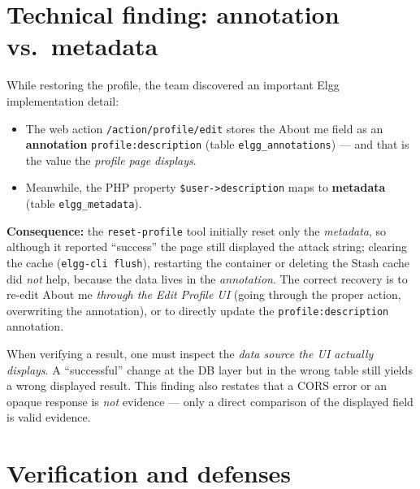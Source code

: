 \documentclass[11pt,a4paper]{article}
\begin{document}
\section{Technical finding: annotation vs.\ metadata}
While restoring the profile, the team discovered an important Elgg implementation detail:
\begin{itemize}
  \item The web action \texttt{/action/profile/edit} stores the About me field as an \textbf{annotation} \texttt{profile:description} (table \texttt{elgg\_annotations}) — and that is the value the \emph{profile page displays}.
  \item Meanwhile, the PHP property \texttt{\$user->description} maps to \textbf{metadata} (table \texttt{elgg\_metadata}).
\end{itemize}
\textbf{Consequence:} the \texttt{reset-profile} tool initially reset only the \emph{metadata}, so although it reported ``success'' the page still displayed the attack string; clearing the cache (\texttt{elgg-cli flush}), restarting the container or deleting the Stash cache did \emph{not} help, because the data lives in the \emph{annotation}. The correct recovery is to re-edit About me \emph{through the Edit Profile UI} (going through the proper action, overwriting the annotation), or to directly update the \texttt{profile:description} annotation.

\begin{infobox}[Lesson]
When verifying a result, one must inspect the \emph{data source the UI actually displays}. A ``successful'' change at the DB layer but in the wrong table still yields a wrong displayed result. This finding also restates that a CORS error or an opaque response is \emph{not} evidence — only a direct comparison of the displayed field is valid evidence.
\end{infobox}

\section{Verification and defenses}\label{sec:defense}
\end{document}
